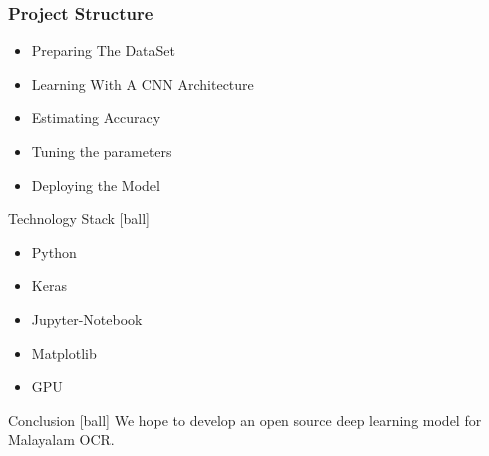 \documentclass{beamer}
\begin{document}
\begin{frame}
\frametitle{Project Structure}
\begin{itemize}
 \item<1->Preparing The DataSet
 \item<2->Learning With A CNN Architecture
 \item<3->Estimating Accuracy
 \item<4->Tuning the parameters
 \item<5->Deploying the Model

\end{itemize}
\end{frame}

\begin{frame}{Technology Stack}
 [ball]
 \begin{itemize}
  \item Python
  \item Keras
  \item Jupyter-Notebook
  \item Matplotlib
  \item GPU

  \end{itemize}
\end{frame}

\begin{frame}{Conclusion}
 [ball]
 We hope to develop an open source deep learning model for Malayalam OCR.
\end{frame}
\end{document}
